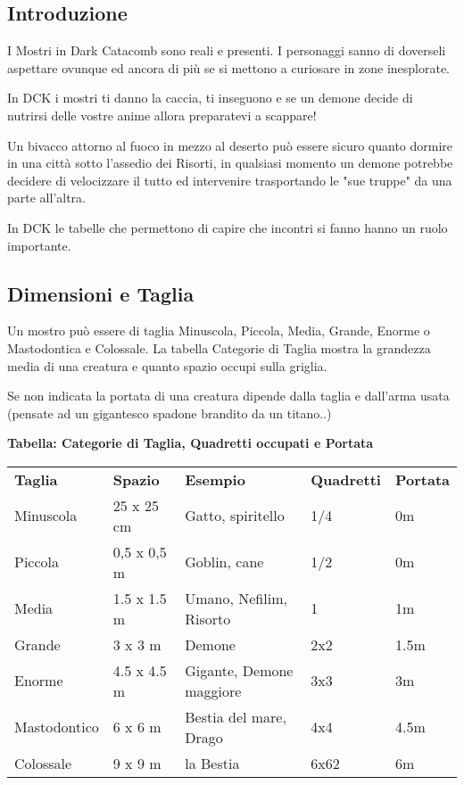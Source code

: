 \documentclass[12pt,a4paper,twoside,openany]{book}
\begin{document}
\begin{multicols}{2}
	
\subsection{Introduzione}
	
I Mostri in Dark Catacomb sono reali e presenti.
I personaggi sanno di doverseli aspettare ovunque ed ancora di più se si mettono a curiosare in zone inesplorate.

In DCK i mostri ti danno la caccia, ti inseguono e se un demone decide di nutrirsi delle vostre anime allora preparatevi a scappare!

Un bivacco attorno al fuoco in mezzo al deserto può essere sicuro quanto dormire in una città sotto l'assedio dei Risorti, in qualsiasi momento un demone potrebbe decidere di velocizzare il tutto ed intervenire trasportando le "sue truppe" da una parte all'altra.

In DCK le tabelle che permettono di capire che incontri si fanno hanno un ruolo importante.

\subsection{Dimensioni e Taglia}

Un mostro può essere di taglia Minuscola, Piccola, Media, Grande, Enorme o Mastodontica e Colossale. La tabella Categorie di Taglia mostra la grandezza media di una creatura e quanto spazio occupi sulla griglia.

Se non indicata la portata di una creatura dipende dalla taglia e dall'arma usata (pensate ad un gigantesco spadone brandito da un titano..)

\end{multicols}

\textbf{Tabella: Categorie di Taglia, Quadretti occupati e Portata}

\medskip

\begin{tabularx}{0.95\textwidth}{lllll}
\toprule
\textbf{Taglia}& \textbf{Spazio} & \textbf{Esempio}&\textbf{Quadretti}&\textbf{Portata}\\
Minuscola & 25 x 25 cm&Gatto, spiritello& 1/4&0m\\
Piccola & 0,5 x 0,5 m & Goblin, cane&1/2&0m\\
Media & 1.5 x 1.5 m & Umano, Nefilim, Risorto &1&1m\\
Grande & 3 x 3 m& Demone&2x2&1.5m\\
Enorme & 4.5 x 4.5 m & Gigante, Demone maggiore&3x3&3m\\
Mastodontico & 6 x 6 m&Bestia del mare, Drago&4x4&4.5m\\
Colossale & 9 x 9 m&la Bestia&6x62&6m\\
\end{tabularx}
\end{document}
